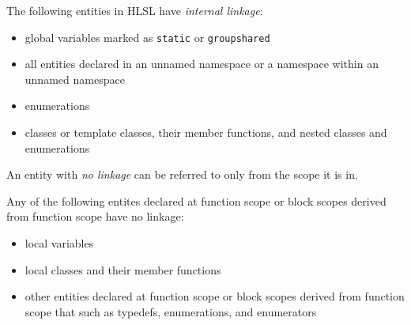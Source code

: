 \p The following entities in HLSL have \textit{internal linkage}:
\begin{itemize}
  \item global variables marked as \texttt{static} or \texttt{groupshared}
  \item all entities declared in an unnamed namespace or a namespace within an unnamed namespace
  \item enumerations
  \item classes or template classes, their member functions, and nested classes and enumerations
\end{itemize}


\p An entity with \textit{no linkage} can be referred to only from the scope it is in.

\p Any of the following entites declared at function scope or block scopes derived from function scope have no linkage:
\begin{itemize}
  \item local variables
  \item local classes and their member functions
  \item other entities declared at function scope or block scopes derived from function scope that such as typedefs, enumerations, and enumerators
\end{itemize}
